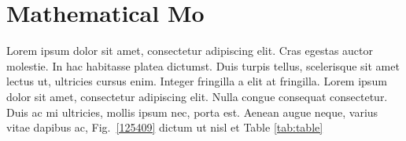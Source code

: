 \section{Mathematical Mo}
\label{igw}

Lorem ipsum dolor sit amet, consectetur adipiscing elit. Cras egestas auctor molestie. In hac habitasse platea dictumst. Duis turpis tellus, scelerisque sit amet lectus ut, ultricies cursus enim. Integer fringilla a elit at fringilla. Lorem ipsum dolor sit amet, consectetur adipiscing elit. Nulla congue consequat consectetur. Duis ac mi ultricies, mollis ipsum nec, porta est. Aenean augue neque, varius vitae dapibus ac, Fig.~\ref{125409} dictum ut nisl et Table \ref{tab:table}
